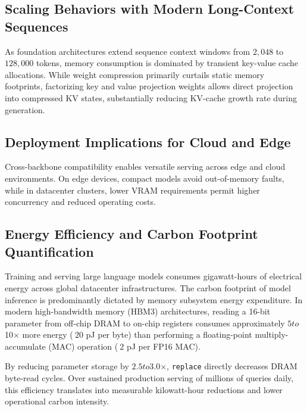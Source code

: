 \subsection{Scaling Behaviors with Modern Long-Context Sequences}
As foundation architectures extend sequence context windows from $2{,}048$ to $128{,}000$ tokens, memory consumption is dominated by transient key-value cache allocations. While weight compression primarily curtails static memory footprints, factorizing key and value projection weights allows direct projection into compressed KV states, substantially reducing KV-cache growth rate during generation.

\subsection{Deployment Implications for Cloud and Edge}
Cross-backbone compatibility enables versatile serving across edge and cloud environments. On edge devices, compact models avoid out-of-memory faults, while in datacenter clusters, lower VRAM requirements permit higher concurrency and reduced operating costs.

\subsection{Energy Efficiency and Carbon Footprint Quantification}
Training and serving large language models consumes gigawatt-hours of electrical energy across global datacenter infrastructures. The carbon footprint of model inference is predominantly dictated by memory subsystem energy expenditure. In modern high-bandwidth memory (HBM3) architectures, reading a 16-bit parameter from off-chip DRAM to on-chip registers consumes approximately $5$\times$ to $10$\times$ more energy ($~20$ pJ per byte) than performing a floating-point multiply-accumulate (MAC) operation ($~2$ pJ per FP16 MAC).

By reducing parameter storage by $2.5$\times$ to $3.0$\times$, \texttt{replace} directly decreases DRAM byte-read cycles. Over sustained production serving of millions of queries daily, this efficiency translates into measurable kilowatt-hour reductions and lower operational carbon intensity.
